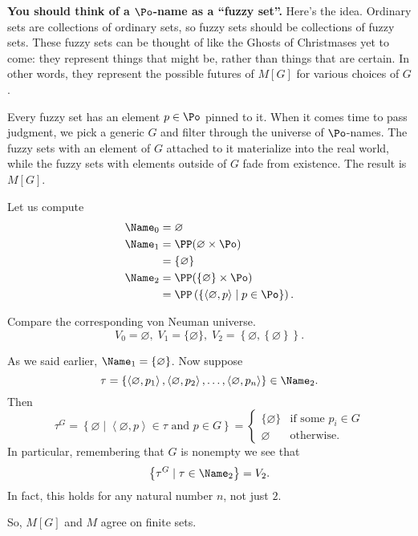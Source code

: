 \textbf{You should think of a $\Po$-name as a ``fuzzy set''.}
Here's the idea.
Ordinary sets are collections of ordinary sets,
so fuzzy sets should be collections of fuzzy sets.
These fuzzy sets can be thought of like the Ghosts of Christmases yet to come:
they represent things that might be, rather than things that are certain.
In other words, they represent the possible futures of $M[G]$ for various choices of $G$.

Every fuzzy set has an element $p \in \Po$ pinned to it.
When it comes time to pass judgment,
we pick a generic $G$ and filter through the universe of $\Po$-names.
The fuzzy sets with an element of $G$ attached to it materialize into the real world,
while the fuzzy sets with elements outside of $G$ fade from existence.
The result is $M[G]$.

\begin{example}
	Let us compute
	\begin{align*}
		\Name_0 &= \varnothing \\
		\Name_1 &= \PP(\varnothing \times \Po) \\
		&= \{\varnothing\} \\
		\Name_2 &= \PP(\{\varnothing\} \times \Po) \\
		&= \PP\left( \left\{
			\left<\varnothing, p\right>
			\mid p \in \Po
		\right\} \right).
	\end{align*}
\end{example}
Compare the corresponding von Neuman universe.
\[ V_0 = \varnothing, \; V_1 = \{\varnothing\}, \;
V_2 = \left\{ \varnothing, \left\{ \varnothing \right\} \right\}. \]

\begin{example}
	As we said earlier, $\Name_1 = \{\varnothing\}$.
	Now suppose
	\[ \tau =
		\left\{
			\left<\varnothing, p_1\right>,
			\left<\varnothing, p_2\right>,
			\dots,
			\left<\varnothing, p_n\right>
		\right\}
		\in \Name_2. \]
	Then
	\[
		\tau^G
		= \left\{ \varnothing \mid
		\left<\varnothing, p\right> \in \tau \text{ and } p \in G\right\}
		=
		\begin{cases}
			\{\varnothing\} & \text{if some } p_i \in G \\
			\varnothing & \text{otherwise}.
		\end{cases}
	\]
	In particular, remembering that $G$ is nonempty we see that
	\[ \left\{ \tau^G \mid \tau \in \Name_2 \right\} = V_2. \]
	In fact, this holds for any natural number $n$, not just $2$.
\end{example}
So, $M[G]$ and $M$ agree on finite sets.

